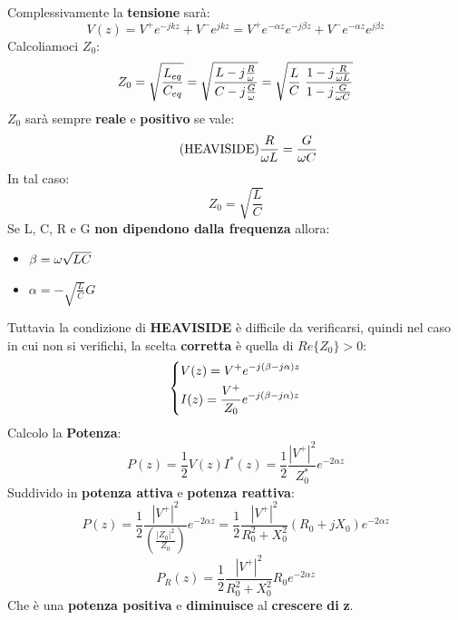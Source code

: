 Complessivamente la \textbf{tensione} sarà:
\begin{equation*}
    V(z) = V^+ e^{-jkz} + V^- e^{jkz} = V^+ e^{-\alpha z} e^{-j\beta z} + V^- e^{-\alpha z} e^{j\beta z}
\end{equation*}
Calcoliamoci $Z_0$:
\begin{equation*}
    Z_0 = \sqrt{\frac{L_{eq}}{C_{eq}}} = \sqrt{\frac{L - j \frac{R}{\omega}}{C - j \frac{G}{\omega}}} = \sqrt{\frac{L}{C} \ \frac{1 - j \frac{R}{\omega L} }{1 - j \frac{G}{\omega C}}}
\end{equation*}
$Z_0$ sarà sempre \textbf{reale} e \textbf{positivo} se vale:
\begin{equation*}
\tag{HEAVISIDE}
    \frac{R}{\omega L} = \frac{G}{\omega C} 
\end{equation*}
In tal caso:
\begin{equation*}
    Z_0 = \sqrt{\frac{L}{C}} 
\end{equation*}
Se L, C, R e G \textbf{non dipendono dalla frequenza} allora:
\begin{itemize}
    \item $\beta = \omega \sqrt{LC}$
    \item $\alpha = - \sqrt{\frac{L}{C}} G$
\end{itemize}
Tuttavia la condizione di \textbf{HEAVISIDE} è difficile da verificarsi, quindi nel caso in cui non si verifichi, la scelta \textbf{corretta} è quella di $Re\{Z_0\} >0$:
\begin{equation*}
    \begin{dcases}
    V(z) = V^+ e^{-j(\beta - j\alpha)z}\\
    I(z) = \frac{V^+}{Z_0} e^{-j(\beta - j\alpha)z}
    \end{dcases}
\end{equation*}
Calcolo la \textbf{Potenza}:
\begin{equation*}
    P(z) = \frac{1}{2} V(z) I^*(z) = \frac{1}{2} \frac{|V^+|^2}{Z_0^*} e^{-2\alpha z}
\end{equation*}
Suddivido in \textbf{potenza attiva} e \textbf{potenza reattiva}:
\begin{equation*}
    P(z) = \frac{1}{2} \frac{|V^+|^2}{\left(\frac{|Z_0|^2}{Z_0}\right)} e^{-2\alpha z} = \frac{1}{2} \frac{|V^+|^2}{R_0^2 +X_0^2} (R_0 + j X_0) e^{-2\alpha z}
\end{equation*}
\begin{equation*}
    P_R(z) =  \frac{1}{2} \frac{|V^+|^2}{R_0^2 +X_0^2}R_0 e^{-2\alpha z}
\end{equation*}
Che è una \textbf{potenza positiva} e \textbf{diminuisce} al \textbf{crescere} \textbf{di} \textbf{z}.\\ \\
